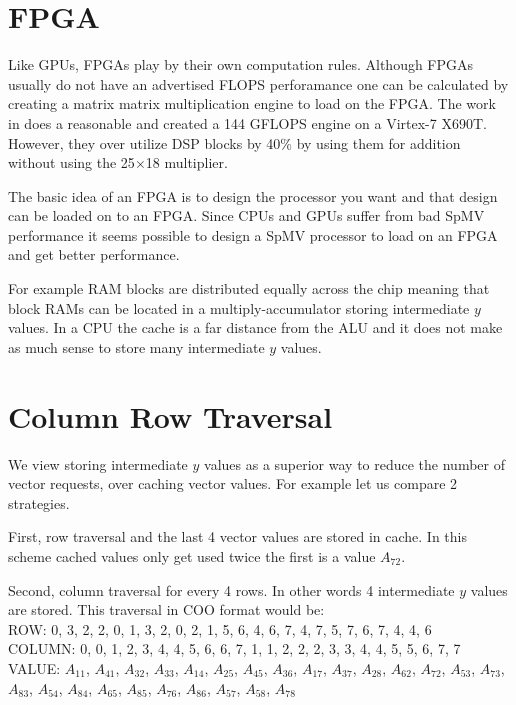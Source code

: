 \section{FPGA}
Like GPUs, FPGAs play by their own computation rules. Although FPGAs usually do not have an advertised FLOPS perforamance one can be calculated by creating a matrix matrix multiplication engine to load on the FPGA. The work in \cite{prelim:cappello} does a reasonable and created a 144 GFLOPS engine on a Virtex-7 X690T. However, they over utilize DSP blocks by 40\% by using them for addition without using the 25$\times$18 multiplier.
\par The basic idea of an FPGA is to design the processor you want and that design can be loaded on to an FPGA. Since CPUs and GPUs suffer from bad SpMV performance it seems possible to design a SpMV processor to load on an FPGA and get better performance.
\par For example RAM blocks are distributed equally across the chip meaning that block RAMs can be located in a multiply-accumulator storing intermediate $y$ values. In a CPU the cache is a far distance from the ALU and it does not make as much sense to store many intermediate $y$ values.
\section{Column Row Traversal}
We view storing intermediate $y$ values as a superior way to reduce the number of vector requests, over caching vector values. For example let us compare 2 strategies. \par
First, row traversal and the last 4 vector values are stored in cache. In this scheme cached values only get used twice the first is a value $A_{72}$. \par
Second, column traversal for every 4 rows. In other words 4 intermediate $y$ values are stored. This traversal in COO format would be:\\
ROW: 0, 3, 2, 2, 0, 1, 3, 2, 0, 2, 1, 5, 6, 4, 6, 7, 4, 7, 5, 7, 6, 7, 4, 4, 6\\
COLUMN: 0, 0, 1, 2, 3, 4, 4, 5, 6, 6, 7, 1, 1, 2, 2, 2, 3, 3, 4, 4, 5, 5, 6, 7, 7\\
VALUE: $A_{11}$, $A_{41}$, $A_{32}$, $A_{33}$, $A_{14}$, $A_{25}$, $A_{45}$, $A_{36}$, $A_{17}$, $A_{37}$, $A_{28}$, $A_{62}$, $A_{72}$, $A_{53}$, $A_{73}$, $A_{83}$, $A_{54}$, $A_{84}$, $A_{65}$, $A_{85}$, $A_{76}$, $A_{86}$, $A_{57}$, $A_{58}$, $A_{78}$\par
